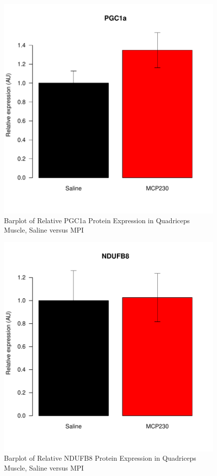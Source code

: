 \documentclass{article}
\begin{document}
\begin{figure}
\begin{center}
\includegraphics{2016-01-21_MitochondrialProteins-barplotPGC1a}
\end{center}
\caption{Barplot of Relative PGC1a Protein Expression in Quadriceps Muscle, Saline versus MPI}
\label{fig:barplotPGC1a}
\end{figure}

\begin{figure}
\begin{center}
\includegraphics{2016-01-21_MitochondrialProteins-barplotNDUFB8}
\end{center}
\caption{Barplot of Relative NDUFB8 Protein Expression in Quadriceps Muscle, Saline versus MPI}
\label{fig:barplotNDUFB8}
\end{figure}
\end{document}
